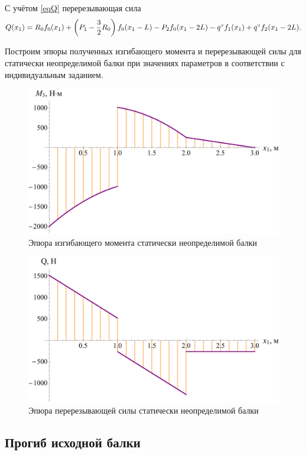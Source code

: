 \documentclass[12pt, a4paper]{article}
\begin{document}
\vspace{-0.25em}

С учётом \eqref{eqQ} перерезывающая сила
\vspace{-0.25em}
\begin{equation*}
	Q(x_1) =  R_0 f_0(x_1) + \left( P_1 - \dfrac{3}{2} R_0 \right) f_0(x_1 - L) - P_2 f_0(x_1 - 2L) - q^{\circ} f_1(x_1) + q^{\circ} f_2(x_1 - 2L). \\
\end{equation*}

Построим эпюры полученных изгибающего момента и перерезывающей силы для статически неопределимой балки при значениях параметров в соответствии с индивидуальным заданием.

\newpage

\begin{figure}[!h]
	\centering
	\includegraphics[width=0.75\linewidth]{plot-10}
	\caption{Эпюра изгибающего момента статически неопределимой балки}
\end{figure} 

\begin{figure}[!h]
	\centering
	\includegraphics[width=0.75\linewidth]{plot-11}
	\caption{Эпюра перерезывающей силы статически неопределимой балки}
\end{figure}

\subsection{Прогиб исходной балки}
\end{document}

